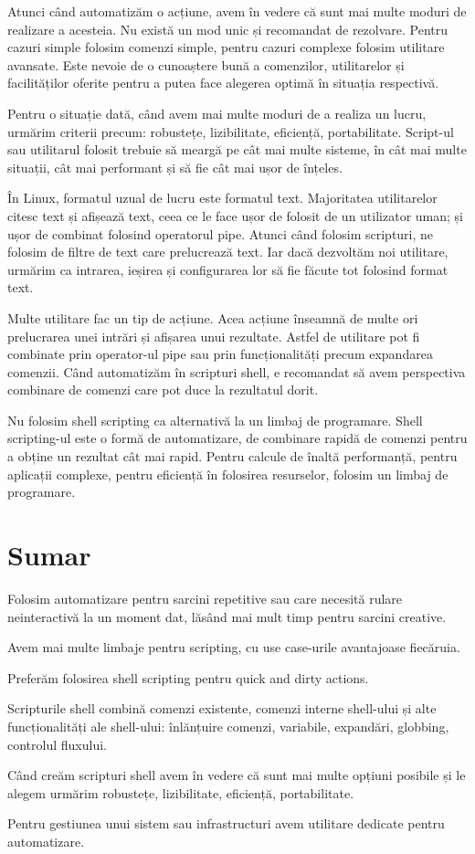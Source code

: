 Atunci când automatizăm o acțiune, avem în vedere că sunt mai multe moduri de
realizare a acesteia. Nu există un mod unic și recomandat de rezolvare. Pentru
cazuri simple folosim comenzi simple, pentru cazuri complexe folosim utilitare
avansate. Este nevoie de o cunoaștere bună a comenzilor, utilitarelor și
facilităților oferite pentru a putea face alegerea optimă în situația
respectivă.

Pentru o situație dată, când avem mai multe moduri de a realiza un lucru,
urmărim criterii precum: robustețe, lizibilitate, eficiență, portabilitate.
Script-ul sau utilitarul folosit trebuie să meargă pe cât mai multe sisteme, în
cât mai multe situații, cât mai performant și să fie cât mai ușor de înțeles.

În Linux, formatul uzual de lucru este formatul text. Majoritatea utilitarelor
citesc text și afișează text, ceea ce le face ușor de folosit de un utilizator
uman; și ușor de combinat folosind operatorul pipe. Atunci când folosim
scripturi, ne folosim de filtre de text care prelucrează text. Iar dacă
dezvoltăm noi utilitare, urmărim ca intrarea, ieșirea și configurarea lor să fie
făcute tot folosind format text.

Multe utilitare fac un tip de acțiune. Acea acțiune înseamnă de multe ori
prelucrarea unei intrări și afișarea unui rezultate. Astfel de utilitare pot fi
combinate prin operator-ul pipe sau prin funcționalități precum expandarea
comenzii. Când automatizăm în scripturi shell, e recomandat să avem perspectiva
combinare de comenzi care pot duce la rezultatul dorit.

Nu folosim shell scripting ca alternativă la un limbaj de programare. Shell
scripting-ul este o formă de automatizare, de combinare rapidă de comenzi pentru
a obține un rezultat cât mai rapid. Pentru calcule de înaltă performanță, pentru
aplicații complexe, pentru eficiență în folosirea resurselor, folosim un limbaj
de programare.

\section{Sumar}
\label{sec:auto-sumar}

Folosim automatizare pentru sarcini repetitive sau care necesită rulare
neinteractivă la un moment dat, lăsând mai mult timp pentru sarcini creative.

Avem mai multe limbaje pentru scripting, cu use case-urile avantajoase
fiecăruia.

Preferăm folosirea shell scripting pentru quick and dirty actions.

Scripturile shell combină comenzi existente, comenzi interne shell-ului și alte
funcționalități ale shell-ului: înlănțuire comenzi, variabile, expandări,
globbing, controlul fluxului.

Când creăm scripturi shell avem în vedere că sunt mai multe opțiuni posibile și
le alegem urmărim robustețe, lizibilitate, eficiență, portabilitate.

Pentru gestiunea unui sistem sau infrastructuri avem utilitare dedicate pentru
automatizare.

